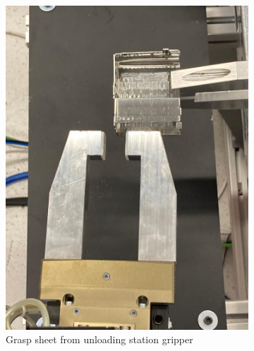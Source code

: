 \begin{figure}[h]
\begin{subfigure}[b]{0.32\textwidth}
        \includegraphics[width=\textwidth]{figures/sheet-pickup/sheet-placement05.png}
        \caption{Grasp sheet from unloading station gripper}
        \label{subfig:sheet-placement05}
    \end{subfigure}\hspace{0.1cm}
    \begin{subfigure}[b]{0.32\textwidth}
        \centering

\end{subfigure}
\end{figure}
